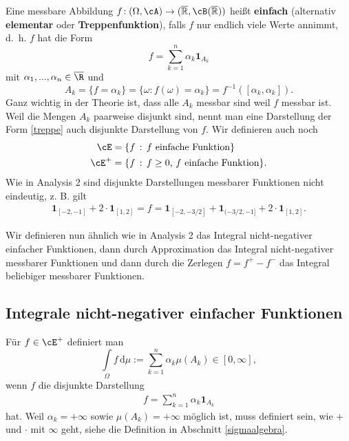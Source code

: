 \begin{deff}
	Eine messbare Abbildung $f \! : (\Omega, \cA) \rightarrow (\overline{\mathbb{R}}, \cB(\overline{\mathbb{R}}))$ heißt \textbf{einfach} (alternativ \textbf{elementar} oder \textbf{Treppenfunktion}), falls $f$ nur endlich viele Werte annimmt, \mbox{d. h.} $f$ hat die Form
	\begin{equation}\label{treppe}
		f = \sum\limits_{k = 1}^{n} \alpha_k \mathbf{1}_{A_k}
	\end{equation}
	mit $\alpha_1, ..., \alpha_n\in \overline \R$ und
	\begin{equation*}
		A_k  = \{ f = \alpha_k \} = \{ \omega \! : f(\omega)=\alpha_k \}= f^{-1} ( [\alpha_k,\alpha_k]).
	\end{equation*}
	Ganz wichtig in der Theorie ist, dass alle $A_k$ messbar sind weil $f$ messbar ist. Weil die Mengen $A_k$ paarweise disjunkt sind, nennt man eine Darstellung der Form \eqref{treppe} auch disjunkte Darstellung von $f$. Wir definieren auch noch
	\begin{align*}
		\cE &= \{f \, : \,\text{$f$ einfache Funktion}\}\\
		\cE^+ &= \{f \, : \,f \geq 0 \text{, $f$ einfache Funktion}\}.\\
	\end{align*}
	Wie in Analysis 2 sind disjunkte Darstellungen messbarer Funktionen nicht eindeutig, z. B. gilt 
	\begin{align*}
		 \mathbf{1}_{[-2,-1]} + 2\cdot\mathbf{1}_{[1,2]}=f=\mathbf{1}_{[-2,-3/2]} + \mathbf{1}_{(-3/2,-1]} +2\cdot\mathbf{1}_{[1,2]}.
	\end{align*}
\end{deff}
Wir definieren nun \"ahnlich wie in Analysis 2 das Integral nicht-negativer einfacher Funktionen, dann durch Approximation das Integral nicht-negativer messbarer Funktionen und dann durch die Zerlegen $f=f^+-f^-$ das Integral beliebiger messbarer Funktionen.
\subsection{Integrale nicht-negativer einfacher Funktionen}

\begin{deff}
	Für $f \in \cE^+$ definiert man \[ \int\limits_{\Omega} f \,\mathrm{d}\mu := \sum\limits_{k = 1}^{n} \alpha_k \mu(A_k) \in [0, \infty], \] wenn $f$ die disjunkte Darstellung 
	\begin{align*}
		f = \sum\limits_{k = 1}^{n} \alpha_k \mathbf{1}_{A_k}
	\end{align*}
	hat. Weil $\alpha_k = + \infty$ sowie $\mu(A_k) = +\infty$ möglich ist, muss definiert sein, wie $+$ und $\cdot$ mit $\infty$ geht, siehe die Definition in Abschnitt \ref{sigmaalgebra}.
\end{deff}

